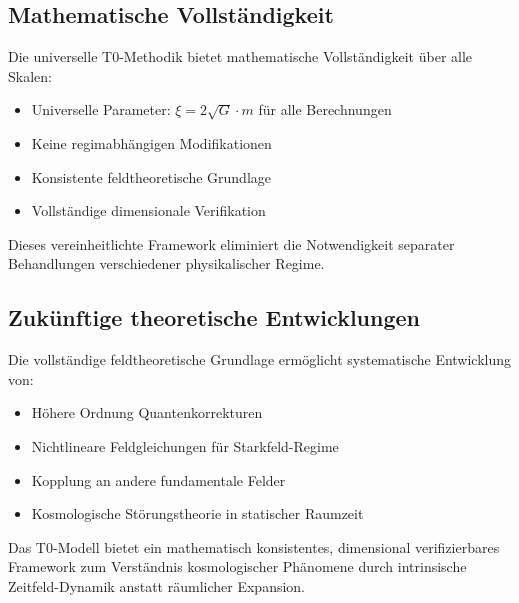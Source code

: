 \documentclass[12pt,a4paper]{article}
\begin{document}
	\subsection{Mathematische Vollständigkeit}
	\label{subsec:mathematische_vollstaendigkeit}
	
	Die universelle T0-Methodik bietet mathematische Vollständigkeit über alle Skalen:
	
	\begin{itemize}
		\item Universelle Parameter: $\xi = 2\sqrt{G} \cdot m$ für alle Berechnungen
		\item Keine regimabhängigen Modifikationen
		\item Konsistente feldtheoretische Grundlage
		\item Vollständige dimensionale Verifikation
	\end{itemize}
	
	Dieses vereinheitlichte Framework eliminiert die Notwendigkeit separater Behandlungen verschiedener physikalischer Regime.
	
	\subsection{Zukünftige theoretische Entwicklungen}
	\label{subsec:zukuenftige_theorie}
	
	Die vollständige feldtheoretische Grundlage ermöglicht systematische Entwicklung von:
	\begin{itemize}
		\item Höhere Ordnung Quantenkorrekturen
		\item Nichtlineare Feldgleichungen für Starkfeld-Regime  
		\item Kopplung an andere fundamentale Felder
		\item Kosmologische Störungstheorie in statischer Raumzeit
	\end{itemize}
	
	Das T0-Modell bietet ein mathematisch konsistentes, dimensional verifizierbares Framework zum Verständnis kosmologischer Phänomene durch intrinsische Zeitfeld-Dynamik anstatt räumlicher Expansion.
	
\end{document}

